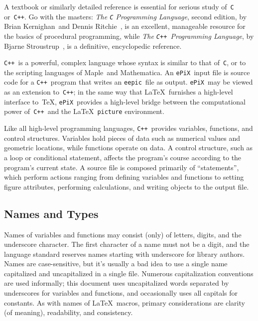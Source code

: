 \documentclass[12pt]{report}
\newcommand{\code}[1]{\texttt{#1}}
\newcommand{\ePiX}{\code{ePiX}}
\newcommand{\eepic}{\code{eepic}}
\newcommand{\C}{\code{C}}
\newcommand{\CXX}{\code{C++}}
\begin{document}
A textbook or similarly detailed reference is essential for serious
study of~\code{C} or~\CXX. Go with the masters: \emph{The \code{C}
  Programming Language}, second edition, by Brian Kernighan~and Dennis
Ritchie~\cite{KnR}, is an excellent, manageable resource for the
basics of procedural programming, while \emph{The \CXX~Programming
  Language}, by Bjarne Stroustrup~\cite{S}, is a definitive,
encyclopedic reference.

\CXX\ is a powerful, complex language whose syntax is similar to that
of~\C, or to the scripting languages of Maple~and Mathematica. An
\ePiX\ input file is source code for a \CXX~program that writes an
\eepic\ file as output.  \ePiX\ may be viewed as an extension to~\CXX;
in the same way that \LaTeX\ furnishes a high-level interface to~\TeX,
\ePiX\ provides a high-level bridge between the computational power
of~\CXX\ and the \LaTeX\ \code{picture} environment. 

Like all high-level programming languages, \CXX\ provides variables,
functions, and control structures. Variables hold pieces of data such
as numerical values and geometric locations, while functions operate
on data. A control structure, such as a loop or conditional statement,
affects the program's course according to the program's current state.
A source file is composed primarily of ``statements'', which perform
actions ranging from defining variables and functions to setting
figure attributes, performing calculations, and writing objects to the
output file.

\subsection*{Names and Types}

Names of variables and functions may consist (only) of letters,
digits, and the underscore character. The first character of a name
must not be a digit, and the language standard reserves names starting
with underscore for library authors. Names are case-sensitive, but
it's usually a bad idea to use a single name capitalized and
uncapitalized in a single file. Numerous capitalization conventions
are used informally; this document uses uncapitalized words separated
by underscores for variables and functions, and occasionally uses all
capitals for constants. As with names of \LaTeX\ macros, primary
considerations are clarity (of meaning), readability, and consistency.
\end{document}
